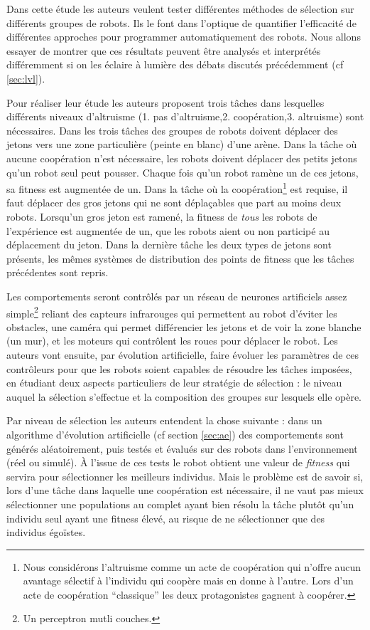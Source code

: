 \documentclass[a4paper,10pt]{article}
\begin{document}
Dans cette étude les auteurs veulent tester différentes méthodes de sélection sur différents groupes de robots. Ils le font dans l'optique de quantifier l'efficacité de différentes approches pour programmer automatiquement des robots. Nous allons essayer de montrer que ces résultats peuvent être analysés et interprétés différemment si on les éclaire à lumière des débats discutés précédemment (cf \ref{sec:lvl}).

Pour réaliser leur étude les auteurs proposent trois tâches dans lesquelles différents niveaux d'altruisme (1. pas d'altruisme,2. coopération,3.  altruisme) sont nécessaires.
Dans les trois tâches des groupes de robots doivent déplacer des jetons vers une zone particulière (peinte en blanc) d'une arène. Dans la tâche où aucune coopération n'est nécessaire, les robots doivent déplacer des petits jetons qu'un robot seul peut pousser. Chaque fois qu'un robot ramène un de ces jetons, sa fitness est augmentée de un. Dans la tâche où la coopération\footnote{Nous considérons l'altruisme comme un acte de coopération qui n'offre aucun avantage sélectif à l'individu qui coopère mais en donne à l'autre. Lors d'un acte de coopération ``classique'' les deux protagonistes gagnent à coopérer.} est requise, il faut déplacer des gros jetons qui ne sont déplaçables que part au moins deux robots. Lorsqu'un gros jeton est ramené, la fitness de \emph{tous} les robots de l'expérience est augmentée de un, que les robots aient ou non participé au déplacement du jeton. Dans la dernière tâche les deux types de jetons sont présents, les mêmes systèmes de distribution des points de fitness que les tâches précédentes sont repris.

Les comportements seront contrôlés par un réseau de neurones artificiels assez simple\footnote{Un perceptron mutli couches.} reliant des capteurs infrarouges qui permettent au robot d'éviter les obstacles, une caméra qui permet différencier les jetons et de voir la zone blanche (un mur), et les moteurs qui contrôlent les roues pour déplacer le robot.
Les auteurs vont ensuite, par évolution artificielle, faire évoluer les paramètres de ces contrôleurs pour que les robots soient capables de résoudre les tâches imposées, en étudiant deux aspects particuliers de leur stratégie de sélection : le niveau auquel la sélection s'effectue et la composition des groupes sur lesquels elle opère. 

Par niveau de sélection les auteurs entendent la chose suivante : dans un algorithme d'évolution artificielle (cf section \ref{sec:ae}) des comportements sont générés aléatoirement, puis testés et évalués sur des robots dans l'environnement (réel ou simulé). \`A l'issue de ces tests le robot obtient une valeur de \emph{fitness} qui servira pour sélectionner les meilleurs individus. Mais le problème est de savoir si, lors d'une tâche dans laquelle une coopération est nécessaire, il ne vaut pas mieux sélectionner une populations au complet ayant bien résolu la tâche plutôt qu'un individu seul ayant une fitness élevé, au risque de ne sélectionner que des individus égoïstes. 
\end{document}
